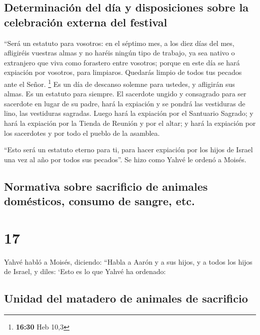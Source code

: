 \hypertarget{determinaciuxf3n-del-duxeda-y-disposiciones-sobre-la-celebraciuxf3n-externa-del-festival}{%
\subsection{Determinación del día y disposiciones sobre la celebración
externa del
festival}\label{determinaciuxf3n-del-duxeda-y-disposiciones-sobre-la-celebraciuxf3n-externa-del-festival}}

 ``Será un estatuto para vosotros: en el séptimo mes, a
los diez días del mes, afligiréis vuestras almas y no haréis ningún tipo
de trabajo, ya sea nativo o extranjero que viva como forastero entre
vosotros;  porque en este día se hará expiación por
vosotros, para limpiaros. Quedarás limpio de todos tus pecados ante el
Señor. \footnote{\textbf{16:30} Heb 10,3}  Es un día de
descanso solemne para ustedes, y afligirán sus almas. Es un estatuto
para siempre.  El sacerdote ungido y consagrado para ser
sacerdote en lugar de su padre, hará la expiación y se pondrá las
vestiduras de lino, las vestiduras sagradas.  Luego hará
la expiación por el Santuario Sagrado; y hará la expiación por la Tienda
de Reunión y por el altar; y hará la expiación por los sacerdotes y por
todo el pueblo de la asamblea.

 ``Esto será un estatuto eterno para ti, para hacer
expiación por los hijos de Israel una vez al año por todos sus
pecados''. Se hizo como Yahvé le ordenó a Moisés.

\hypertarget{normativa-sobre-sacrificio-de-animales-domuxe9sticos-consumo-de-sangre-etc.}{%
\subsection{Normativa sobre sacrificio de animales domésticos, consumo
de sangre,
etc.}\label{normativa-sobre-sacrificio-de-animales-domuxe9sticos-consumo-de-sangre-etc.}}

\hypertarget{section-16}{%
\section{17}\label{section-16}}

 Yahvé habló a Moisés, diciendo:  ``Habla a
Aarón y a sus hijos, y a todos los hijos de Israel, y diles: `Esto es lo
que Yahvé ha ordenado:

\hypertarget{unidad-del-matadero-de-animales-de-sacrificio}{%
\subsection{Unidad del matadero de animales de
sacrificio}\label{unidad-del-matadero-de-animales-de-sacrificio}}

